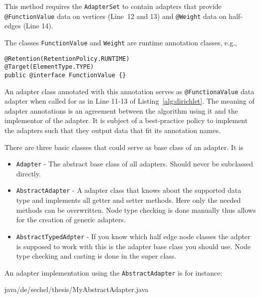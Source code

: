 \documentclass[Thesis.tex]{subfiles}
\begin{document}
This method requires the {\tt AdapterSet} to contain adapters that provide
{\tt @FunctionValue} data on vertices (Line~12 and 13) and {\tt @Weight} data on half-edges (Line 14). 

The classes {\tt FunctionValue} and {\tt Weight} are runtime annotation classes, e.g.,

\begin{lstlisting}
@Retention(RetentionPolicy.RUNTIME)
@Target(ElementType.TYPE)
public @interface FunctionValue {}
\end{lstlisting}

An adapter class annotated with this annotation serves as {\tt @FunctionaValue} data adapter when 
called for as in Line 11-13 of Listing~\ref{alg:dirichlet}. The meaning of adapter annotations is 
an agreement between the algorithm using it and the implementor of the adapter. It is subject
of a best-practice policy to implement the adapters such that they output data that fit its 
annotation names.

There are three basic classes that could serve as base class of an adapter. It is

\begin{itemize}
\item {\tt Adapter} - The abstract base class of all adapters. Should never be subclassed directly.
\item {\tt AbstractAdapter} - A adapter class that knows about the supported data type and implements
all getter and setter methods. Here only the needed methods can be overwritten. Node type checking
is done manually thus allows for the creation of generic adapters.
\item {\tt AbstractTypedAdpter} - If you know which half edge node classes the adpter is supposed to
work with this is the adapter base class you should use. Node type checking and casting is done in the
super class.
\end{itemize}

An adapter implementation using the {\tt AbstractAdapter} is for instance:

 {java/de/sechel/thesis/MyAbstractAdapter.java}
\end{document}
